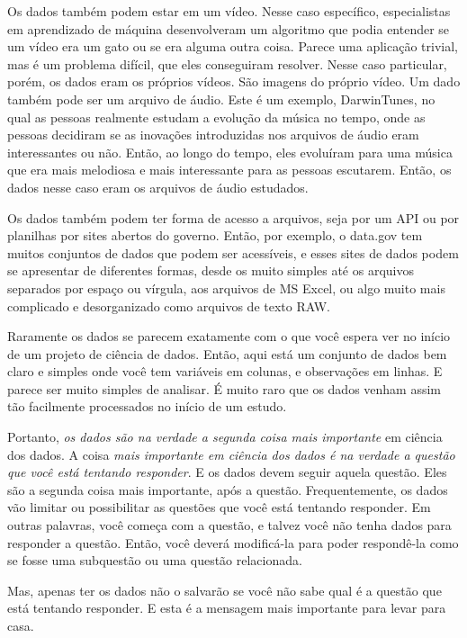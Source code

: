 Os dados também podem estar em um vídeo. Nesse caso específico, especialistas em aprendizado de máquina desenvolveram um algoritmo que podia entender se um vídeo era um gato ou se era alguma outra coisa. Parece uma aplicação trivial, mas é um problema difícil, que eles conseguiram resolver. Nesse caso particular, porém, os dados eram os próprios vídeos. São imagens do próprio vídeo. Um dado também pode ser um arquivo de áudio. Este é um exemplo, DarwinTunes, no qual as pessoas realmente estudam a evolução da música no tempo, onde as pessoas decidiram se as inovações introduzidas nos arquivos de áudio eram interessantes ou não. Então, ao longo do tempo, eles evoluíram para uma música que era mais melodiosa e mais interessante para as pessoas escutarem. Então, os dados nesse caso eram os arquivos de áudio estudados.

Os dados também podem ter forma de acesso a arquivos, seja por um API ou por planilhas por sites abertos do governo. Então, por exemplo, o data.gov tem muitos conjuntos de dados que podem ser acessíveis, e esses sites de dados podem se apresentar de diferentes formas, desde os muito simples até os arquivos separados por espaço ou vírgula, aos arquivos de MS Excel, ou algo muito mais complicado e desorganizado como arquivos de texto RAW. 

Raramente os dados se parecem exatamente com o que você espera ver no início de um projeto de ciência de dados. Então, aqui está um conjunto de dados bem claro e simples onde você tem variáveis em colunas, e observações em linhas. E parece ser muito simples de analisar. É muito raro que os dados venham assim tão facilmente processados no início de um estudo. 

Portanto, \emph{os dados são na verdade a segunda coisa mais importante} em ciência dos dados. A coisa \emph{mais importante em ciência dos dados é na verdade a questão que você está tentando responder}. E os dados devem seguir aquela questão. Eles são a segunda coisa mais importante, após a questão. Frequentemente, os dados vão limitar ou possibilitar as questões que você está tentando responder. Em outras palavras, você começa com a questão, e talvez você não tenha dados para responder a questão. Então, você deverá modificá-la para poder respondê-la como se fosse uma subquestão ou uma questão relacionada. 

Mas, apenas ter os dados não o salvarão se você não sabe qual é a questão que está tentando responder. E esta é a mensagem mais importante para levar para casa.

